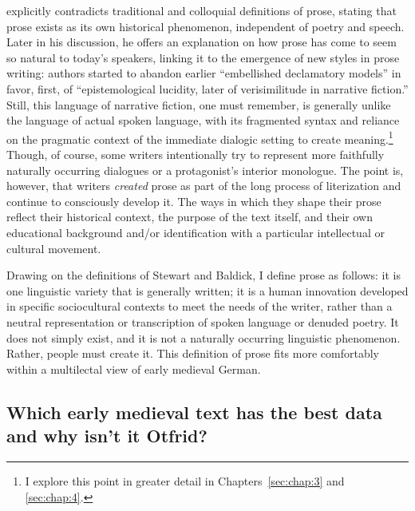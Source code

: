 \begin{sloppypar}
\noindent \citet{Stewart2018} explicitly contradicts traditional and colloquial definitions of prose, stating that prose exists as its own historical phenomenon, independent of poetry and speech. Later in his discussion, he offers an explanation on how prose has come to seem so natural to today’s speakers, linking it to the emergence of new styles in prose writing: authors started to abandon earlier “embellished declamatory models” in favor, first, of “epistemological lucidity, later of verisimilitude in narrative fiction.” Still, this language of narrative fiction, one must remember, is generally unlike the language of actual spoken language, with its fragmented syntax and reliance on the pragmatic context of the immediate dialogic setting to create meaning.\footnote{{I explore this point in greater detail in Chapters~\ref{sec:chap:3} and \ref{sec:chap:4}.}} Though, of course, some writers intentionally try to represent more faithfully naturally occurring dialogues or a protagonist’s interior monologue. The point is, however, that writers \textit{created} prose as part of the long process of literization and continue to consciously develop it. The ways in which they shape their prose reflect their historical context, the purpose of the text itself, and their own educational background and/or identification with a particular intellectual or cultural movement.
\end{sloppypar}

Drawing on the definitions of Stewart and Baldick, I define prose as follows: it is one linguistic variety that is generally written; it is a human innovation developed in specific sociocultural contexts to meet the needs of the writer, rather than a neutral representation or transcription of spoken language or denuded poetry. It does not simply exist, and it is not a naturally occurring linguistic phenomenon. Rather, people must create it. This definition of prose fits more comfortably within a multilectal view of early medieval German.

\subsection{Which early medieval text has the best data and why isn’t it Otfrid?}\label{sec:2.2.2}


